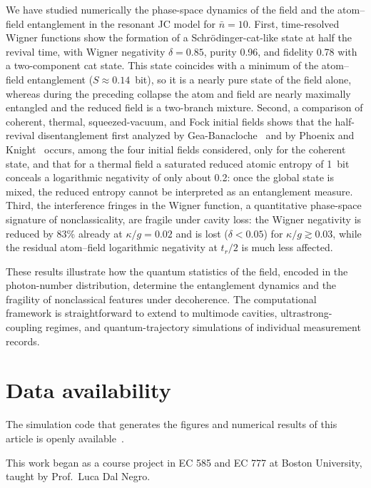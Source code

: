 \documentclass[%
 reprint,
 amsmath,amssymb,
 aps,
 floatfix,
]{revtex4-2}
\begin{document}
We have studied numerically the phase-space dynamics of the field and the atom--field entanglement in the resonant JC model for $\bar{n} = 10$. First, time-resolved Wigner functions show the formation of a Schr\"{o}dinger-cat-like state at half the revival time, with Wigner negativity $\delta = 0.85$, purity 0.96, and fidelity 0.78 with a two-component cat state. This state coincides with a minimum of the atom--field entanglement ($S \approx 0.14$~bit), so it is a nearly pure state of the field alone, whereas during the preceding collapse the atom and field are nearly maximally entangled and the reduced field is a two-branch mixture. Second, a comparison of coherent, thermal, squeezed-vacuum, and Fock initial fields shows that the half-revival disentanglement first analyzed by Gea-Banacloche~\cite{gea-banacloche1990} and by Phoenix and Knight~\cite{phoenix1988, phoenix1991} occurs, among the four initial fields considered, only for the coherent state, and that for a thermal field a saturated reduced atomic entropy of 1~bit conceals a logarithmic negativity of only about 0.2: once the global state is mixed, the reduced entropy cannot be interpreted as an entanglement measure. Third, the interference fringes in the Wigner function, a quantitative phase-space signature of nonclassicality, are fragile under cavity loss: the Wigner negativity is reduced by 83\% already at $\kappa/g = 0.02$ and is lost ($\delta < 0.05$) for $\kappa/g \gtrsim 0.03$, while the residual atom--field logarithmic negativity at $t_r/2$ is much less affected.

These results illustrate how the quantum statistics of the field, encoded in the photon-number distribution, determine the entanglement dynamics and the fragility of nonclassical features under decoherence. The computational framework is straightforward to extend to multimode cavities, ultrastrong-coupling regimes, and quantum-trajectory simulations of individual measurement records.


\section*{Data availability}
The simulation code that generates the figures and numerical results of this article is openly available~\cite{nguyen2026code}.

\begin{acknowledgments}
This work began as a course project in EC 585 and EC 777 at Boston University, taught by Prof.\ Luca Dal Negro.
\end{acknowledgments}
\end{document}
